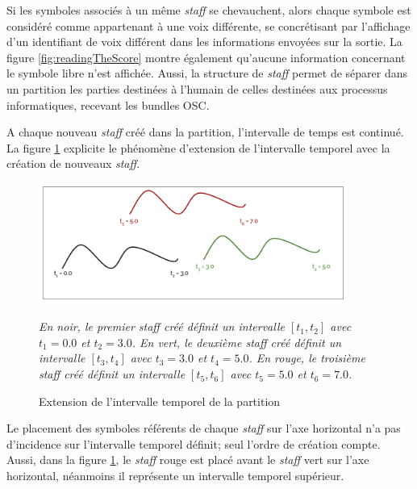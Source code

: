 Si les symboles associés à un même \textit{staff} se chevauchent, alors chaque symbole est considéré comme appartenant à une voix différente, se concrétisant par l'affichage d'un identifiant de voix différent dans les informations envoyées sur la sortie. La figure \ref{fig:readingTheScore} montre également qu'aucune information concernant le symbole libre n'est affichée. Aussi, la structure de \textit{staff} permet de séparer dans un partition les parties destinées à l'humain de celles destinées aux processus informatiques, recevant les bundles OSC.

A chaque nouveau \textit{staff} créé dans la partition, l'intervalle de temps est continué. La figure \ref{fig:stavesCreation} explicite le phénomène d'extension de l'intervalle temporel avec la création de nouveaux \textit{staff}.

\begin{figure}[H]
	\centering
	\includegraphics[keepaspectratio=true, width=0.9\textwidth]{ModeleDeNotation/i/stavesCreation.png}
	\caption{Extension de l'intervalle temporel de la partition}
	\label{fig:stavesCreation}
	\small
	\it
	En noir, le premier \emph{staff} créé définit un intervalle $[t_1, t_2]$ avec $t_1 = 0.0$ et $t_2 = 3.0$. En vert, le deuxième \emph{staff} créé définit un intervalle $[t_3, t_4]$ avec $t_3 = 3.0$ et $t_4 = 5.0$. En rouge, le troisième \emph{staff} créé définit un intervalle $[t_5, t_6]$ avec $t_5 = 5.0$ et $t_6 = 7.0$.
\end{figure}

Le placement des symboles référents de chaque \textit{staff} sur l'axe horizontal n'a pas d'incidence sur l'intervalle temporel définit; seul l'ordre de création compte. Aussi, dans la figure \ref{fig:stavesCreation}, le \textit{staff} rouge est placé avant le \textit{staff} vert sur l'axe horizontal, néanmoins il représente un intervalle temporel supérieur. 

